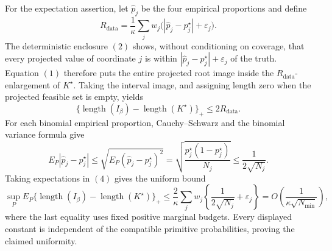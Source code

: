 For the expectation assertion, let \(\widehat p_j\) be the four empirical proportions and define
\[
R_{\mathrm{data}}
=\frac1\kappa\sum_jw_j
\bigl(|\widehat p_j-p_j^\star|+\varepsilon_j\bigr).
\]
The deterministic enclosure \((2)\) shows, without conditioning on coverage, that every projected value of coordinate \(j\) is within \(|\widehat p_j-p_j^\star|+\varepsilon_j\) of the truth. Equation \((1)\) therefore puts the entire projected root image inside the \(R_{\mathrm{data}}\)-enlargement of \(K^\star\). Taking the interval image, and assigning length zero when the projected feasible set is empty, yields
\[
\{\operatorname{length}(I_\beta)-\operatorname{length}(K^\star)\}_+
\leq2R_{\mathrm{data}}.
\tag{4}
\]
For each binomial empirical proportion, Cauchy--Schwarz and the binomial variance formula give
\[
E_P|\widehat p_j-p_j^\star|
\leq\sqrt{E_P(\widehat p_j-p_j^\star)^2}
=\sqrt{\frac{p_j^\star(1-p_j^\star)}{N_j}}
\leq\frac1{2\sqrt{N_j}}.
\]
Taking expectations in \((4)\) gives the uniform bound
\[
\sup_P E_P
\{\operatorname{length}(I_\beta)-\operatorname{length}(K^\star)\}_+
\leq\frac2\kappa\sum_jw_j
\left\{\frac1{2\sqrt{N_j}}+\varepsilon_j\right\}
=O\!\left(\frac1{\kappa\sqrt{N_{\min}}}\right),
\]
where the last equality uses fixed positive marginal budgets. Every displayed constant is independent of the compatible primitive probabilities, proving the claimed uniformity.
